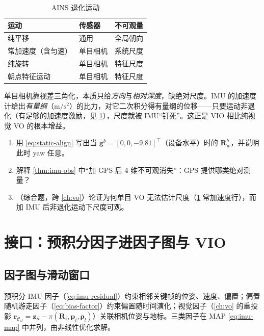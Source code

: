 \begin{table}[H]\centering\small
\caption{AINS 退化运动\cite{carlone2026handbook}}
\label{tab:imu-degenerate}
\begin{tabular}{lll}
\toprule
运动 & 传感器 & 不可观量 \\
\midrule
纯平移 & 通用 & 全局朝向 \\
常加速度（含匀速） & 单目相机 & 系统尺度 \\
纯旋转 & 单目相机 & 特征尺度 \\
朝点特征运动 & 单目相机 & 特征尺度 \\
\bottomrule
\end{tabular}
\end{table}

\begin{insight}\label{ins:imu-scale}
单目相机靠视差三角化，本质只给\emph{方向}与\emph{相对深度}，缺绝对尺度。IMU 的加速度计给出\emph{有量纲}（$\mathrm{m/s^2}$）的比力，对它二次积分得有量纲的位移——只要运动非退化（有足够的加速度激励，见 \cref{tab:imu-degenerate}），尺度就被 IMU“钉死”。这正是 VIO 相比纯视觉 VO 的根本增益。
\end{insight}

\begin{practice}
\begin{enumerate}
  \item 用 \cref{eq:static-align} 写出当 $\mathbf g^b=[0,0,-9.81]^\top$（设备水平）时的 $\mathbf R_w^b$，并说明此时 yaw 任意。
  \item 解释 \cref{thm:imu-obs} 中“加 GPS 后 4 维不可观消失”：GPS 提供哪类绝对测量？
  \item （综合题，跨 \cref{ch:vo}）论证为何单目 VO 无法估计尺度（\cref{tab:imu-degenerate} 常加速度行），而加 IMU 后非退化运动下尺度可观。
\end{enumerate}
\end{practice}

\section{接口：预积分因子进因子图与 VIO}
\label{sec:imu-interface}

\subsection{因子图与滑动窗口}
\label{subsec:factor-graph}

预积分 IMU 因子（\cref{eq:imu-residual}）约束相邻关键帧的位姿、速度、偏置；偏置随机游走因子（\cref{eq:bias-factor}）约束偏置随时间演化；视觉因子（\cref{ch:vo} 的重投影 $\mathbf r_{\mathcal C_{il}}=\mathbf z_{il}-\pi(\mathbf R_i,\mathbf p_i,\boldsymbol\rho_l)$）关联相机位姿与地标。三类因子在 MAP \cref{eq:imu-map} 中并列，由非线性优化求解。

